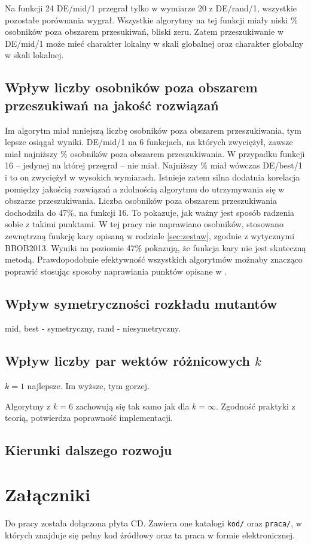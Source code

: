 \documentclass[a4paper,onecolumn,oneside,11pt,wide,floatssmall]{mwrep}
\theoremstyle{definition}
\theoremstyle{plain}%
\theoremstyle{remark}
\begin{document}
Na funkcji 24 DE/mid/1 przegrał tylko w wymiarze 20 z DE/rand/1, wszystkie pozostałe porównania 
wygrał. Wszystkie algorytmy na tej funkcji miały niski \% osobników poza obszarem przesukiwań, 
bliski zeru. Zatem przeszukiwanie w DE/mid/1 może mieć charakter lokalny w skali globalnej 
oraz charakter globalny w skali lokalnej.

\section{Wpływ liczby osobników poza obszarem przeszukiwań na jakość rozwiązań}

Im algorytm miał mniejszą liczbę osobników poza obszarem przeszukiwania, tym lepsze osiągał wyniki.
DE/mid/1 na 6 funkcjach, na których zwyciężył, zawsze miał najniższy \% osobników poza obszarem
przeszukiwania. W przypadku funkcji 16 -- jedynej na której przegrał -- nie miał. Najniższy \% miał 
wówczas DE/best/1 i to on zwyciężył w wysokich wymiarach. Istnieje zatem silna dodatnia korelacja
pomiędzy jakością rozwiązań a zdolnością algorytmu do utrzymywania się w obszarze przeszukiwania.
Liczba osobników poza obszarem przeszukiwania dochodziła do 47\%, na funkcji 16. To pokazuje,
jak ważny jest sposób radzenia sobie z takimi punktami. W tej pracy nie 
naprawiano osobników, stosowano zewnętrzną funkcję kary opisaną w rodziale \ref{sec:zestaw},
zgodnie z wytycznymi BBOB2013. Wyniki na poziomie 47\% pokazują, że funkcja kary nie jest 
skuteczną metodą. Prawdopodobnie efektywność wszystkich algorytmów możnaby znacząco poprawić 
stosując sposoby naprawiania punktów opisane w \cite{boundary}.
 
\section{Wpływ symetryczności rozkładu mutantów}

mid, best - symetryczny, rand - niesymetryczny.

\section{Wpływ liczby par wektów różnicowych $k$}

$k = 1$ najlepsze. Im wyższe, tym gorzej.

Algorytmy z $k = 6$ zachowują się tak samo jak dla $k = \infty$. Zgodność praktyki z teorią, 
potwierdza poprawność implementacji.

\section{Kierunki dalszego rozwoju}

\appendix

\chapter{Załączniki}

Do pracy została dołączona płyta CD. Zawiera one katalogi \texttt{kod/} oraz \texttt{praca/},
w których znajduje się pełny kod źródłowy oraz ta praca w formie elektronicznej.

\nocite{*}


\end{document}
